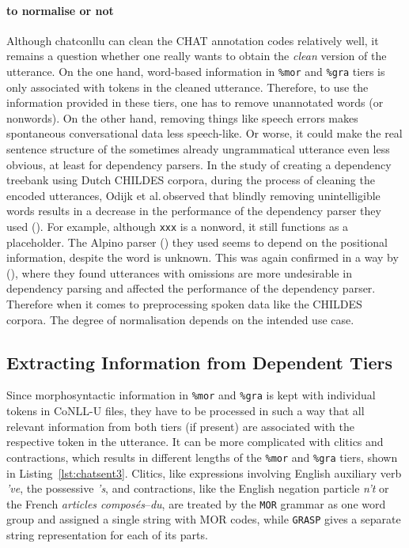 \paragraph{to normalise or not} Although chatconllu can clean the CHAT annotation codes relatively well, it remains a question whether one really wants to obtain the \emph{clean} version of the utterance. On the one hand, word-based information in \texttt{\%mor} and \texttt{\%gra} tiers is only associated with tokens in the cleaned utterance. Therefore, to use the information provided in these tiers, one has to remove unannotated words (or nonwords). On the other hand, removing things like speech errors makes spontaneous conversational data less speech-like. Or worse, it could make the real sentence structure of the sometimes already ungrammatical utterance even less obvious, at least for dependency parsers. In the study of creating a dependency treebank using Dutch CHILDES corpora, during the process of cleaning the encoded utterances, Odijk et al.\,observed that blindly removing unintelligible words results in a decrease in the performance of the dependency parser they used (\cite{odijk2018anncor}). For example, although \texttt{xxx} is a nonword, it still functions as a placeholder. The Alpino parser (\cite{bouma}) they used seems to depend on the positional information, despite the word is unknown. This was again confirmed in a way by (\cite{liu2021}), where they found utterances with omissions are more undesirable in dependency parsing and affected the performance of the dependency parser. Therefore when it comes to preprocessing spoken data like the CHILDES corpora. The degree of normalisation depends on the intended use case.

\subsection{Extracting Information from Dependent Tiers}

Since morphosyntactic information in \texttt{\%mor} and \texttt{\%gra} is kept with individual tokens in CoNLL-U files, they have to be processed in such a way that all relevant information from both tiers (if present) are associated with the respective token in the utterance. It can be more complicated with clitics and contractions, which results in different lengths of the \texttt{\%mor} and \texttt{\%gra} tiers, shown in Listing~\ref{lst:chatsent3}. Clitics, like expressions involving English auxiliary verb \emph{'ve}, the possessive \emph{'s}, and contractions, like the English negation particle \emph{n't} or the French \emph{articles composés}--\emph{du}, are treated by the \texttt{MOR} grammar as one word group and assigned a single string with MOR codes, while \texttt{GRASP} gives a separate string representation for each of its parts.\\


